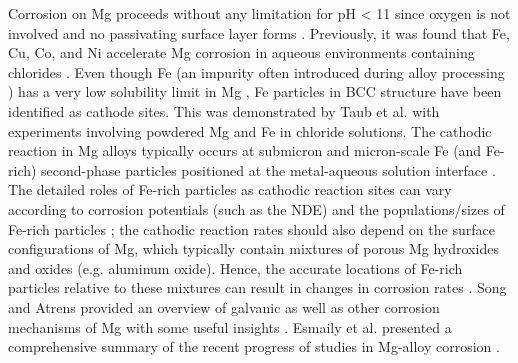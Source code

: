 Corrosion on Mg proceeds without any limitation for pH < 11 since oxygen is not involved and no passivating surface layer forms \cite{liu2016controlling,ralston2012effect}. Previously, it was found that Fe, Cu, Co, and Ni accelerate Mg corrosion in aqueous environments containing chlorides \cite{hanawalt1942corrosion, mcnulty1942some}. Even though Fe (an impurity often introduced during alloy processing \cite{yang2015corrosion, scharf2007iron}) has a very low solubility limit in Mg \cite{mcnulty1942some}, Fe particles in \ac{BCC} structure have been identified as cathode sites. This was demonstrated by Taub et al. \cite{taub2002mechanism} with experiments involving powdered Mg and Fe in chloride solutions. The cathodic reaction in Mg alloys typically occurs at submicron and micron-scale Fe (and Fe-rich) second-phase particles positioned at the metal-aqueous solution interface \cite{yang2015corrosion, eaves2012inhibition}. The detailed roles of Fe-rich particles as cathodic reaction sites can vary according to corrosion potentials (such as the \ac{NDE}) and the populations/sizes of Fe-rich particles \cite{hoche2016effect, yang2018effect}; the cathodic reaction rates should also depend on the surface configurations of Mg, which typically contain mixtures of porous Mg hydroxides and oxides (e.g. aluminum oxide). Hence, the accurate locations of Fe-rich particles relative to these mixtures can result in changes in corrosion rates \cite{taheri2012analysis, taheri2014towards}. Song and Atrens provided an overview of galvanic as well as other corrosion mechanisms of Mg with some useful insights \cite{song2003understanding}. Esmaily et al. presented a comprehensive summary of the recent progress of studies in Mg-alloy corrosion \cite{esmaily2017fundamentals}.

